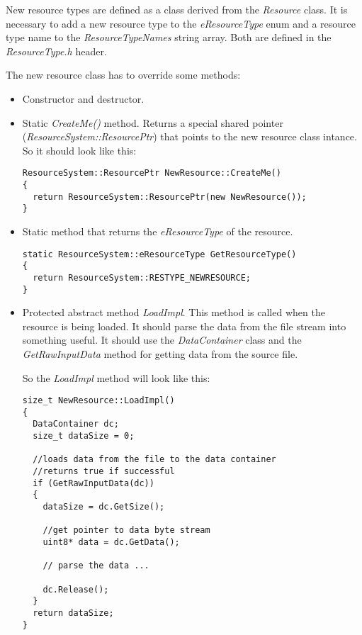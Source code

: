\documentclass[a4paper, 12pt]{report}
\begin{document}
New resource types are defined as a class derived from the \emph{Resource} class. It is necessary to add a new resource type to the \emph{eResourceType} enum and a resource type name to the \emph{ResourceTypeNames} string array. Both are defined in the \emph{ResourceType.h} header.

The new resource class has to override some methods:

\begin{itemize}
\item
Constructor and destructor.
\item
Static \emph{CreateMe()} method. Returns a special shared pointer (\emph{ResourceSystem::ResourcePtr}) that points to the new resource class intance. So it should look like this:

\footnotesize 
\begin{verbatim}
ResourceSystem::ResourcePtr NewResource::CreateMe()
{
  return ResourceSystem::ResourcePtr(new NewResource());
}
\end{verbatim}
\normalsize

\item
Static method that returns the \emph{eResourceType} of the resource.

\footnotesize 
\begin{verbatim}
static ResourceSystem::eResourceType GetResourceType() 
{ 
  return ResourceSystem::RESTYPE_NEWRESOURCE; 
}
\end{verbatim}
\normalsize

\item
Protected abstract method \emph{LoadImpl}. This method is called when the resource is being loaded. It should parse the data from the file stream into something useful. It should use the \emph{DataContainer} class and the \emph{GetRawInputData} method for getting data from the source file.

So the \emph{LoadImpl} method will look like this:

\footnotesize 
\begin{verbatim}
size_t NewResource::LoadImpl()
{
  DataContainer dc;
  size_t dataSize = 0;

  //loads data from the file to the data container
  //returns true if successful
  if (GetRawInputData(dc))	
  {
    dataSize = dc.GetSize();

    //get pointer to data byte stream
    uint8* data = dc.GetData();

    // parse the data ...

    dc.Release();
  }
  return dataSize;
}
\end{verbatim}
\normalsize


\end{itemize}
\end{document}
